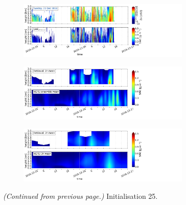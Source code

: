 \begin{figure}[H]\ContinuedFloat
	\centering
	\begin{subfigure}[t]{\textwidth}
		\centering
		\includegraphics[trim={0.cm 2.2cm 19.cm 0.5cm},clip,width=0.9\textwidth]{./fig_obs_ret/20161225}
		\caption{}\label{fig:SWC:ret_25}
	\end{subfigure}
	\begin{subfigure}[t]{\textwidth}
		\centering
		\includegraphics[trim={0.cm 2.2cm 19.cm 0.5cm},clip,width=0.9\textwidth]{./fig_vert_SWC_EM/20161225}
		\caption{}\label{fig:SWC_EM:25}
	\end{subfigure}
	\begin{subfigure}[t]{\textwidth}
		\centering
		\includegraphics[trim={0.cm 0.8cm 19.cm 0.5cm},clip,width=0.9\textwidth]{./fig_vert_SWC_3h/20161225}
		\caption{}\label{fig:SWC3h:25}
	\end{subfigure}
	\caption{\textit{(Continued from previous page.)} Initialisation \SI{25}{\dec}.}
\end{figure}
